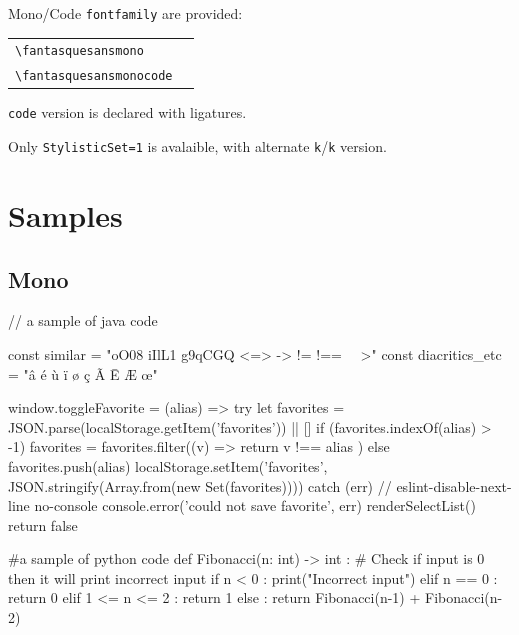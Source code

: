 \documentclass[a4paper]{scrartcl}
\newcommand*{\opt}[1]{\texttt{#1}}
\newcommand*{\cmd}[1]{\texttt{\textbackslash #1}}\newcommand*{\showtchar}[1]{\cmd{#1}~\csname #1\endcsname}
\newcommand\samplettxt{oO08 iIlL1 g9qCGQ <=> -> != !== \string~\string~>}
\newcommand\samplett[1][]{\cmd{#1} & \fbox{\csname#1\endcsname\samplettxt} \\}
\begin{document}
Mono/Code \opt{fontfamily} are provided:

\begin{tabular}{ll}
	\samplett[fantasquesansmono]
	\samplett[fantasquesansmonocode]
\end{tabular}

\opt{code} version is declared with ligatures.

\smallskip

Only \opt{StylisticSet={1}} is avalaible, with alternate \opt{k}/{\opt{k}} version.

\section{Samples}

\subsection{Mono}


\begin{codeblock}[minted language=java, title=Sample java code]
// a sample of java code

const similar = "oO08 iIlL1 g9qCGQ <=> -> != !== ~~>"
const diacritics_etc = "â é ù ï ø ç Ã Ē Æ œ"

window.toggleFavorite = (alias) => {
  try {
    let favorites = JSON.parse(localStorage.getItem('favorites')) || []
    if (favorites.indexOf(alias) > -1) {
      favorites = favorites.filter((v) => {
        return v !== alias
      })
    } else {
      favorites.push(alias)
    }
    localStorage.setItem('favorites', JSON.stringify(Array.from(new Set(favorites))))
  } catch (err) {
    // eslint-disable-next-line no-console
    console.error('could not save favorite', err)
  }
  renderSelectList()
  return false
}
\end{codeblock}

\begin{codeblock}[minted language=python3, title=Sample python code]
#a sample of python code
def Fibonacci(n: int) -> int :
  # Check if input is 0 then it will print incorrect input
  if n < 0 :
    print("Incorrect input")
  elif n == 0 :
    return 0
  elif 1 <= n <= 2 :
    return 1
  else :
    return Fibonacci(n-1) + Fibonacci(n-2)
\end{codeblock}
\end{document}
